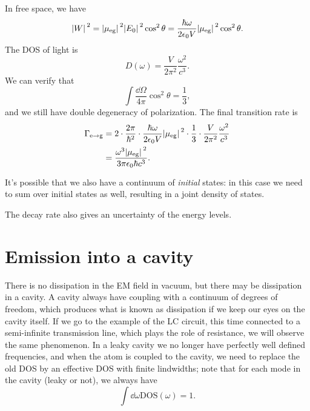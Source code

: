 \documentclass[hyperref, a4paper]{article}
\begin{document}
In free space, we have 
\begin{equation}
    \abs*{W}^2 = \abs*{\mu_{\text{eg}}}^2 \abs*{E_0}^2 \cos^2 \theta
    = \frac{\hbar \omega}{2 \epsilon_0 V} \abs*{\mu_{\text{eg}}}^2 \cos^2 \theta.
\end{equation}
The DOS of light is 
\begin{equation}
    D(\omega) = \frac{V}{2 \pi^2} \frac{\omega^2}{c^3}.
    \label{eq:dos-free-space}
\end{equation}
We can verify that 
\begin{equation}
    \int \frac{\dd{\Omega}}{4\pi} \cos^2 \theta = \frac{1}{3},
\end{equation}
and we still have double degeneracy of polarization.
The final transition rate is 
\begin{equation}
    \begin{aligned}
        \Gamma_{\text{e} \to \text{g}} &= 
        2 \cdot \frac{2\pi}{\hbar^2} \cdot \frac{\hbar \omega}{2 \epsilon_0 V} \abs*{\mu_{\text{eg}}}^2 \cdot \frac{1}{3} \cdot \frac{V}{2 \pi^2} \frac{\omega^2}{c^3} \\
        &= \frac{
            \omega^3 \abs*{\mu_{\text{eg}}}^2
        }{
            3 \pi \epsilon_0 \hbar c^3
        }.
    \end{aligned}
\end{equation}

It's possible that we also have a continuum of \emph{initial} states:
in this case we need to sum over initial states as well,
resulting in a joint density of states. 

The decay rate also gives an uncertainty of the energy levels.

\section{Emission into a cavity}

There is no dissipation in the EM field in vacuum,
but there may be dissipation in a cavity.
A cavity always have coupling with a continuum of degrees of freedom,
which produces what is known as dissipation 
if we keep our eyes on the cavity itself.
If we go to the example of the LC circuit,
this time connected to a semi-infinite transmission line,
which plays the role of resistance,
we will observe the same phenomenon.
In a leaky cavity we no longer have perfectly well defined frequencies, 
and when the atom is coupled to the cavity,
we need to replace the old DOS by an effective DOS 
with finite lindwidths; 
note that for each mode in the cavity (leaky or not), we always have 
\begin{equation}
    \int \dd{\omega} \text{DOS}(\omega) = 1.
\end{equation}
\end{document}

